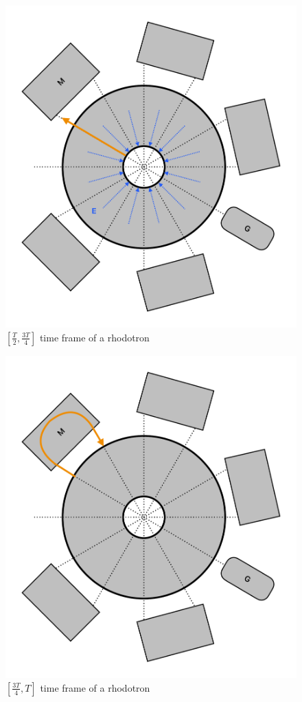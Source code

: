 \documentclass{article}
\begin{document}
\begin{figure}[H]
    \centering
    \includegraphics[width=\textwidth]{../../../figures/illustrations/rhod3.pdf}
    \caption{$[\frac{T}{2}, \frac{3T}{4}]$ time frame of a rhodotron}
    \label{fig:rhod_cycle_3}
\end{figure}
\begin{figure}[H]
    \centering
    \includegraphics[width=\textwidth]{../../../figures/illustrations/rhod4.pdf}
    \caption{$[\frac{3T}{4}, T]$ time frame of a rhodotron}
    \label{fig:rhod_cycle_4}
\end{figure}
\end{document}
